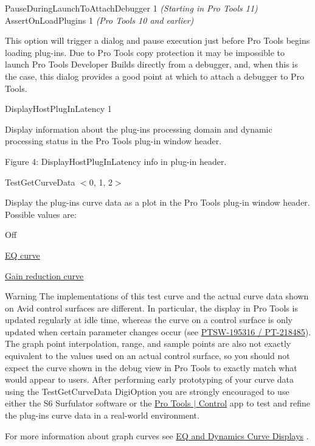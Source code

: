 \begin{DoxyItemize}
\item  {\ttfamily Pause\+During\+Launch\+To\+Attach\+Debugger 1} {\itshape (Starting in Pro Tools 11)}~\newline
 {\ttfamily Assert\+On\+Load\+Plugins 1} {\itshape (Pro Tools 10 and earlier)}

This option will trigger a dialog and pause execution just before Pro Tools begins loading plug-\/ins. Due to Pro Tools copy protection it may be impossible to launch Pro Tools Developer Builds directly from a debugger, and, when this is the case, this dialog provides a good point at which to attach a debugger to Pro Tools.


\item  {\ttfamily Display\+Host\+Plug\+In\+Latency 1}

Display information about the plug-\/in\textquotesingle{}s processing domain and dynamic processing status in the Pro Tools plug-\/in window header.

  Figure 4\+: Display\+Host\+Plug\+In\+Latency info in plug-\/in header.


\item  {\ttfamily Test\+Get\+Curve\+Data $<$0, 1, 2$>$}

Display the plug-\/in\textquotesingle{}s curve data as a plot in the Pro Tools plug-\/in window header. Possible values are\+: 
\begin{DoxyEnumerate}
\item Off 
\item \hyperlink{a00342_gga59c73d8f51c5c55d54a728eff39da884a01b32d7031ceff45f7acad05dcddad19}{E\+Q curve} 
\item \hyperlink{a00342_gga59c73d8f51c5c55d54a728eff39da884a011b1b00d6189a8903735dcae2f8bc93}{Gain reduction curve} 
\end{DoxyEnumerate}\begin{DoxyWarning}{Warning}
The implementations of this test curve and the actual curve data shown on Avid control surfaces are different. In particular, the display in Pro Tools is updated regularly at idle time, whereas the curve on a control surface is only updated when certain parameter changes occur (see \hyperlink{a00374_PTSW-195316}{P\+T\+S\+W-\/195316 / P\+T-\/218485}). The graph point interpolation, range, and sample points are also not exactly equivalent to the values used on an actual control surface, so you should not expect the curve shown in the debug view in Pro Tools to exactly match what would appear to users. After performing early prototyping of your curve data using the Test\+Get\+Curve\+Data Digi\+Option you are strongly encouraged to use either the S6 Surfulator software or the \hyperlink{a00363_subsubsection__avid_ptcontrol}{Pro Tools $\vert$ Control} app to test and refine the plug-\/in\textquotesingle{}s curve data in a real-\/world environment.
\end{DoxyWarning}
For more information about graph curves see \hyperlink{a00342}{E\+Q and Dynamics Curve Displays} .


\end{DoxyItemize}
